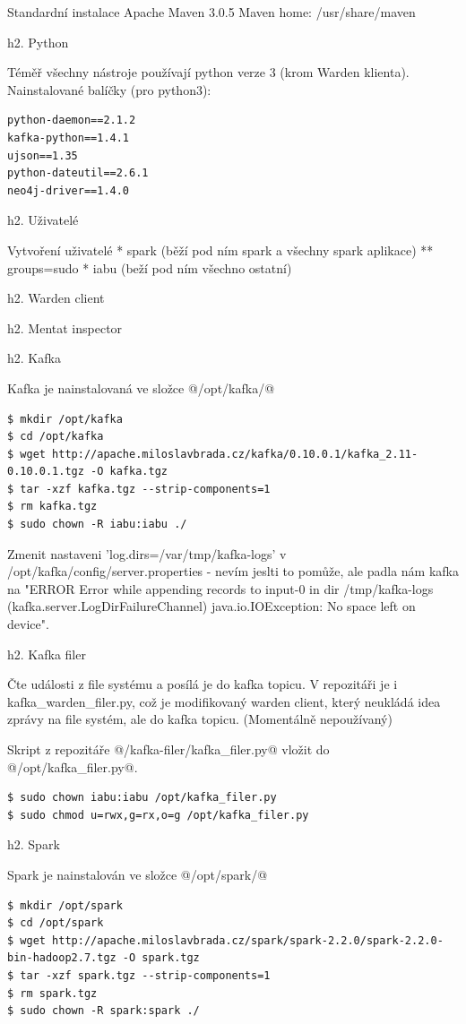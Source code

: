 \documentclass[a4paper]{article} %
\begin{document}
Standardní instalace Apache Maven 3.0.5
Maven home: /usr/share/maven

h2. Python

Téměř všechny nástroje používají python verze 3 (krom Warden klienta).
Nainstalované balíčky (pro python3):
\begin{lstlisting}[]
python-daemon==2.1.2
kafka-python==1.4.1
ujson==1.35
python-dateutil==2.6.1
neo4j-driver==1.4.0
\end{lstlisting}

h2. Uživatelé

Vytvoření uživatelé
* spark (běží pod ním spark a všechny spark aplikace)
** groups=sudo
* iabu (beží pod ním všechno ostatní)

h2. Warden client

h2. Mentat inspector

h2. Kafka

Kafka je nainstalovaná ve složce @/opt/kafka/@

\begin{lstlisting}[]
$ mkdir /opt/kafka
$ cd /opt/kafka
$ wget http://apache.miloslavbrada.cz/kafka/0.10.0.1/kafka_2.11-0.10.0.1.tgz -O kafka.tgz
$ tar -xzf kafka.tgz --strip-components=1
$ rm kafka.tgz
$ sudo chown -R iabu:iabu ./
\end{lstlisting}

Zmenit nastaveni 'log.dirs=/var/tmp/kafka-logs' v /opt/kafka/config/server.properties - nevím jeslti to pomůže, ale padla nám kafka na "ERROR Error while appending records to input-0 in dir /tmp/kafka-logs (kafka.server.LogDirFailureChannel) java.io.IOException: No space left on device".

h2. Kafka filer

Čte události z file systému a posílá je do kafka topicu. 
V repozitáři je i kafka\_warden\_filer.py, což je modifikovaný warden client, který neukládá idea zprávy na file systém, ale do kafka topicu. (Momentálně nepoužívaný)

Skript z repozitáře @/kafka-filer/kafka\_filer.py@ vložit do @/opt/kafka\_filer.py@.

\begin{lstlisting}[]
$ sudo chown iabu:iabu /opt/kafka_filer.py
$ sudo chmod u=rwx,g=rx,o=g /opt/kafka_filer.py
\end{lstlisting}

h2. Spark

Spark je nainstalován ve složce @/opt/spark/@

\begin{lstlisting}[]
$ mkdir /opt/spark
$ cd /opt/spark
$ wget http://apache.miloslavbrada.cz/spark/spark-2.2.0/spark-2.2.0-bin-hadoop2.7.tgz -O spark.tgz
$ tar -xzf spark.tgz --strip-components=1
$ rm spark.tgz
$ sudo chown -R spark:spark ./
\end{lstlisting}
\end{document}
